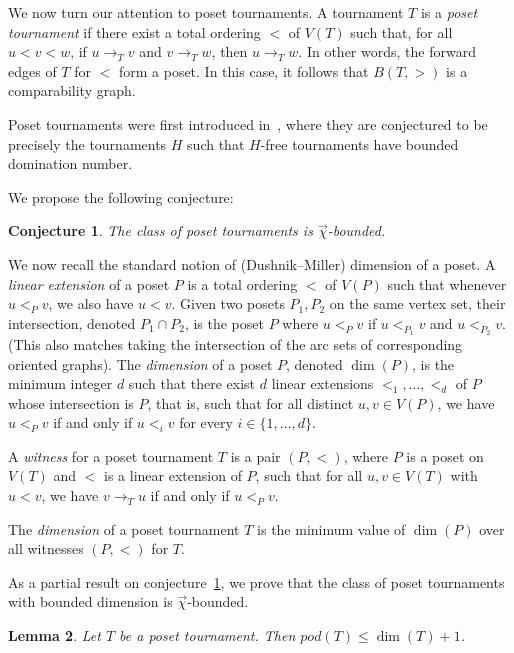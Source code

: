 \documentclass{article}
\newcommand{\dic}{\vec\chi}
\renewcommand{\le}{\leqslant}
\newtheorem{lemma}{Lemma}
\newtheorem{conj}[lemma]{Conjecture}
\begin{document}

We now turn our attention to poset tournaments.
A tournament $T$ is a \textit{poset tournament} if there exist a total ordering $<$ of $V(T)$ such that, for all $u < v < w$, if $u \to_T v$ and $v \to_T w$, then $u \to_T w$. In other words, the forward edges of $T$ for $<$ form a poset. In this case, it follows that $B(T,>)$ is a comparability graph.

Poset tournaments were first introduced in~\cite{dom_in_tournaments}, where they are conjectured to be precisely the tournaments $H$ such that $H$-free tournaments have bounded domination number.

We propose the following conjecture:

\begin{conj}\label{conj:poset_chi_bounded}
    The class of poset tournaments is $\dic$-bounded.
\end{conj}

We now recall the standard notion of (Dushnik–Miller) dimension of a poset. A \emph{linear extension} of a poset $P$ is a total ordering $<$ of $V(P)$ such that whenever $u <_P v$, we also have $u < v$. Given two posets $P_1,P_2$ on the same vertex set, their intersection, denoted $P_1 \cap P_2$, is the poset $P$ where $u <_P v$ if $u <_{P_1} v$ and $u <_{P_2} v$. (This also matches taking the intersection of the arc sets of corresponding oriented graphs).
The \emph{dimension} of a poset $P$, denoted $\dim(P)$, is the minimum integer $d$ such that there exist $d$ linear extensions $<_1,\dots,<_d$ of $P$ whose intersection is $P$, that is, such that for all distinct $u,v \in V(P)$, we have $u <_P v$ if and only if $u <_i v$ for every $i \in \{1,\dots,d\}$.

A \emph{witness} for a poset tournament $T$ is a pair $(P,<)$, where $P$ is a poset on $V(T)$ and $<$ is a linear extension of $P$, such that for all $u,v \in V(T)$ with $u<v$, we have $v\to_T u$ if and only if $u <_P v$.

The \emph{dimension} of a poset tournament $T$ is the minimum value of $\dim(P)$ over all witnesses $(P,<)$ for $T$.

As a partial result on  conjecture~\ref{conj:poset_chi_bounded}, we prove that the class of poset tournaments with bounded dimension is $\dic$-bounded. 

\begin{lemma}\label{lem:dim2pod} 
Let $T$ be a poset tournament. Then $pod(T) \le \dim(T) + 1$.
\end{lemma}
\end{document}
